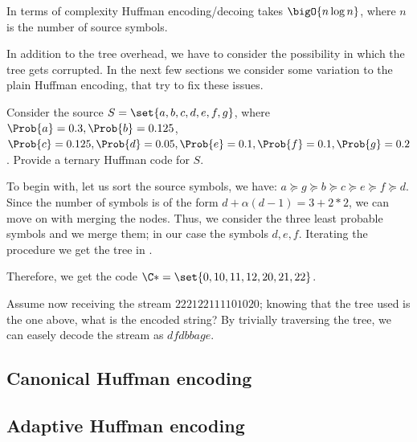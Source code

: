 \documentclass{subfiles}
\begin{document}
    In terms of complexity Huffman encoding/decoing takes \(\bigO{n \log n}\),
        where \(n\) is the number of source symbols. 

    In addition to the tree overhead, we have to consider the possibility in 
        which the tree gets corrupted. In the next few sections we consider some 
        variation to the plain Huffman encoding, that try to fix these issues.

    \clearpage
    \begin{example*}
        Consider the source \(S = \set{a, b, c, d, e, f, g}\), 
            where \(\Prob{a} = 0.3, \Prob{b} = 0.125\), \(\Prob{c} = 0.125, 
            \Prob{d} = 0.05, \Prob{e} = 0.1, \Prob{f} = 0.1, \Prob{g} = 0.2\).
            Provide a ternary Huffman code for \(S\).

        To begin with, let us sort the source symbols, we have: \(a \succeq g \succeq b
            \succeq c \succeq e \succeq f \succeq d\). Since the number of symbols
            is of the form \(d + \alpha(d - 1) = 3 + 2*2\), we can move on with merging the nodes.
            Thus, we consider the three least probable symbols and we merge them;
            in our case the symbols \(d, e, f\). 
            Iterating the procedure we get the tree in .

            

        Therefore, we get the code \(\C* = \set{0, 10, 11, 12, 20, 21, 22}\).

        Assume now receiving the stream \(22 21 22 11 11 0 10 20\); 
            knowing that the tree used is the one above, what is the encoded string?
            By trivially traversing the tree, we can easely decode the stream as 
            \(dfdbbage\).
    \end{example*}

    \subsection{Canonical Huffman encoding}
    

    \subsection{Adaptive Huffman encoding}
    

    \nocite{huffman1952}
\end{document}
